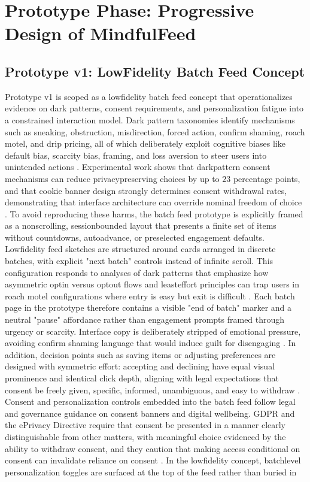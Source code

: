 \documentclass{article}
\begin{document}
\section{Prototype Phase: Progressive Design of MindfulFeed}

\subsection{Prototype v1: Low\-Fidelity Batch Feed Concept}
\label{sec:prototype_v1_batch_feed} Prototype v1 is scoped as a low\-fidelity batch feed concept that operationalizes evidence on dark patterns, consent requirements, and personalization fatigue into a constrained interaction model. Dark pattern taxonomies identify mechanisms such as sneaking, obstruction, misdirection, forced action, confirm shaming, roach motel, and drip pricing, all of which deliberately exploit cognitive biases like default bias, scarcity bias, framing, and loss aversion to steer users into unintended actions \parencites[2]{5127387}[2]{4807303}. Experimental work shows that dark\-pattern consent mechanisms can reduce privacy\-preserving choices by up to $23$ percentage points, and that cookie banner design strongly determines consent withdrawal rates, demonstrating that interface architecture can override nominal freedom of choice \parencites[2]{4807303}. To avoid reproducing these harms, the batch feed prototype is explicitly framed as a non\-scrolling, session\-bounded layout that presents a finite set of items without countdowns, auto\-advance, or preselected engagement defaults. Low\-fidelity feed sketches are structured around cards arranged in discrete batches, with explicit "next batch" controls instead of infinite scroll. This configuration responds to analyses of dark patterns that emphasize how asymmetric opt\-in versus opt\-out flows and least\-effort principles can trap users in roach motel configurations where entry is easy but exit is difficult \parencites[2]{5127387}[2]{4807303}. Each batch page in the prototype therefore contains a visible "end of batch" marker and a neutral "pause" affordance rather than engagement prompts framed through urgency or scarcity. Interface copy is deliberately stripped of emotional pressure, avoiding confirm shaming language that would induce guilt for disengaging \parencites[2]{5127387}. In addition, decision points such as saving items or adjusting preferences are designed with symmetric effort: accepting and declining have equal visual prominence and identical click depth, aligning with legal expectations that consent be freely given, specific, informed, unambiguous, and easy to withdraw \parencites[4]{5678011}[2]{4807303}. Consent and personalization controls embedded into the batch feed follow legal and governance guidance on consent banners and digital well\-being. GDPR and the ePrivacy Directive require that consent be presented in a manner clearly distinguishable from other matters, with meaningful choice evidenced by the ability to withdraw consent, and they caution that making access conditional on consent can invalidate reliance on consent \parencites[4]{5678011}. In the low\-fidelity concept, batch\-level personalization toggles are surfaced at the top of the feed rather than buried in 
\end{document}
